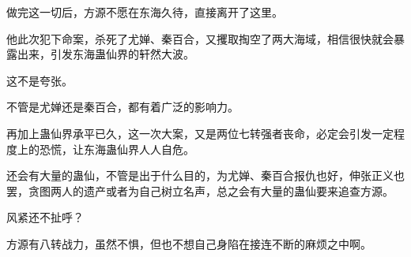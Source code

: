 \begin{this_body}
做完这一切后，方源不愿在东海久待，直接离开了这里。

他此次犯下命案，杀死了尤婵、秦百合，又攫取掏空了两大海域，相信很快就会暴露出来，引发东海蛊仙界的轩然大波。

这不是夸张。

不管是尤婵还是秦百合，都有着广泛的影响力。

再加上蛊仙界承平已久，这一次大案，又是两位七转强者丧命，必定会引发一定程度上的恐慌，让东海蛊仙界人人自危。

还会有大量的蛊仙，不管是出于什么目的，为尤婵、秦百合报仇也好，伸张正义也罢，贪图两人的遗产或者为自己树立名声，总之会有大量的蛊仙要来追查方源。

风紧还不扯呼？

方源有八转战力，虽然不惧，但也不想自己身陷在接连不断的麻烦之中啊。

\end{this_body}

